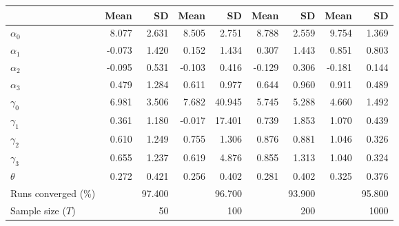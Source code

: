 
\begin{tabular}[t]{lrrrrrrrr}
\toprule
  & Mean & SD & Mean  & SD  & Mean   & SD   & Mean    & SD   \\
\midrule
$\alpha_{0}$ & 8.077 & 2.631 & 8.505 & 2.751 & 8.788 & 2.559 & 9.754 & 1.369\\
$\alpha_{1}$ & -0.073 & 1.420 & 0.152 & 1.434 & 0.307 & 1.443 & 0.851 & 0.803\\
$\alpha_{2}$ & -0.095 & 0.531 & -0.103 & 0.416 & -0.129 & 0.306 & -0.181 & 0.144\\
$\alpha_{3}$ & 0.479 & 1.284 & 0.611 & 0.977 & 0.644 & 0.960 & 0.911 & 0.489\\
$\gamma_{0}$ & 6.981 & 3.506 & 7.682 & 40.945 & 5.745 & 5.288 & 4.660 & 1.492\\
$\gamma_{1}$ & 0.361 & 1.180 & -0.017 & 17.401 & 0.739 & 1.853 & 1.070 & 0.439\\
$\gamma_{2}$ & 0.610 & 1.249 & 0.755 & 1.306 & 0.876 & 0.881 & 1.046 & 0.326\\
$\gamma_{3}$ & 0.655 & 1.237 & 0.619 & 4.876 & 0.855 & 1.313 & 1.040 & 0.324\\
$\theta$ & 0.272 & 0.421 & 0.256 & 0.402 & 0.281 & 0.402 & 0.325 & 0.376\\
Runs converged (\%) &  & 97.400 &  & 96.700 &  & 93.900 &  & 95.800\\
Sample size ($T$) &  & 50 &  & 100 &  & 200 &  & 1000\\
\bottomrule
\end{tabular}
